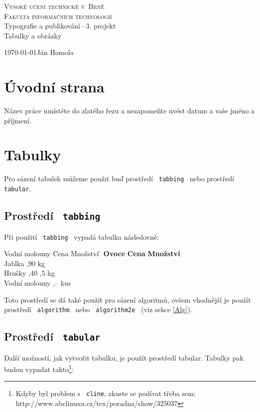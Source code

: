 \documentclass[a4paper, 11pt]{article}
\begin{document}
\begin{titlepage}
    \begin{center}
        \textsc{{\Huge Vysoké učení technické v~Brně}\\[0.4em]
                {\huge Fakulta informačních technologií}}\\
        {\LARGE Typografie a publikování\,--\,3. projekt}\\[0.3em]
        {\Huge Tabulky a obrázky}
    \end{center}
{\Large \today \hfill Ján Homola}
\end{titlepage}

\section{Úvodní strana}
Název práce umístěte do zlatého řezu a nezapomeňte uvést  datum a vaše jméno a příjmení.

\section{Tabulky}
Pro sázení tabulek můžeme použıt buď prostředí \texttt{ tabbing } nebo prostředí \texttt{ tabular}.

\subsection{Prostředí \texttt{ tabbing}}
Při použití \texttt{ tabbing } vypadá tabulka následovně:

\begin{tabbing}
    Vodní molouny \quad \= Cena \quad \= Množství \= \kill
    \textbf{Ovoce} \> \textbf{Cena} \> \textbf{Množství} \\
    Jablka ,90  kg \\
    Hrušky ,40 ,5 kg \\
    Vodní molouny ,--  kus
\end{tabbing}
\bigskip

\noindent Toto prostředí se dá také použít pro sázení algoritmů, ovšem vhodnější je použít
prostředí \texttt{ algorithm } nebo \texttt{ algorithm2e } (viz sekce \ref{Alg}).

\subsection{Prostředí \texttt{ tabular}}
Další možností, jak vytvořit tabulku, je použít prostředí tabular. Tabulky pak
budou vypadat takto\footnote{Kdyby byl problem s \texttt{ cline}, zkuste se podívat třeba sem:
http://www.abclinuxu.cz/tex/poradna/show/325037}:
\bigskip
\end{document}
